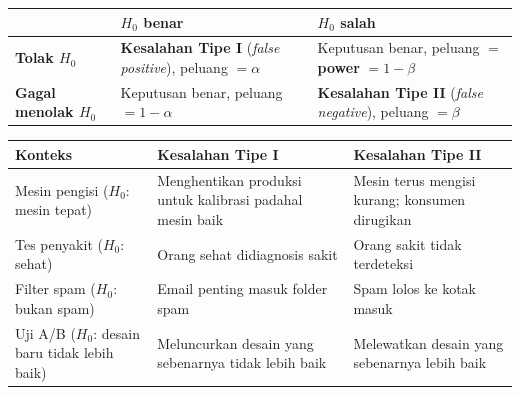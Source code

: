 \documentclass[
  indonesian,
  letterpaper,
]{book}
\newcounter{none} %
\begin{document}
{\def\LTcaptype{none} %
\begin{longtable}[]{@{}
  >{\raggedright\arraybackslash}p{}
  >{\raggedright\arraybackslash}p{}
  >{\raggedright\arraybackslash}p{}@{}}
\toprule\noalign{}
\begin{minipage}[b]{\linewidth}\raggedright
\end{minipage} & \begin{minipage}[b]{\linewidth}\raggedright
\(H_0\) benar
\end{minipage} & \begin{minipage}[b]{\linewidth}\raggedright
\(H_0\) salah
\end{minipage} \\
\midrule\noalign{}
\endhead
\bottomrule\noalign{}
\endlastfoot
\textbf{Tolak \(H_0\)} & \textbf{Kesalahan Tipe I} (\emph{false
positive}), peluang \(= \alpha\) & Keputusan benar, peluang \(=\)
\textbf{power} \(= 1 - \beta\) \\
\textbf{Gagal menolak \(H_0\)} & Keputusan benar, peluang
\(= 1 - \alpha\) & \textbf{Kesalahan Tipe II} (\emph{false negative}),
peluang \(= \beta\) \\
\end{longtable}
}

{\def\LTcaptype{none} %
\begin{longtable}[]{@{}
  >{\raggedright\arraybackslash}p{}
  >{\raggedright\arraybackslash}p{}
  >{\raggedright\arraybackslash}p{}@{}}
\toprule\noalign{}
\begin{minipage}[b]{\linewidth}\raggedright
Konteks
\end{minipage} & \begin{minipage}[b]{\linewidth}\raggedright
Kesalahan Tipe I
\end{minipage} & \begin{minipage}[b]{\linewidth}\raggedright
Kesalahan Tipe II
\end{minipage} \\
\midrule\noalign{}
\endhead
\bottomrule\noalign{}
\endlastfoot
Mesin pengisi (\(H_0\): mesin tepat) & Menghentikan produksi untuk
kalibrasi padahal mesin baik & Mesin terus mengisi kurang; konsumen
dirugikan \\
Tes penyakit (\(H_0\): sehat) & Orang sehat didiagnosis sakit & Orang
sakit tidak terdeteksi \\
Filter spam (\(H_0\): bukan spam) & Email penting masuk folder spam &
Spam lolos ke kotak masuk \\
Uji A/B (\(H_0\): desain baru tidak lebih baik) & Meluncurkan desain
yang sebenarnya tidak lebih baik & Melewatkan desain yang sebenarnya
lebih baik \\
\end{longtable}
}
\end{document}
